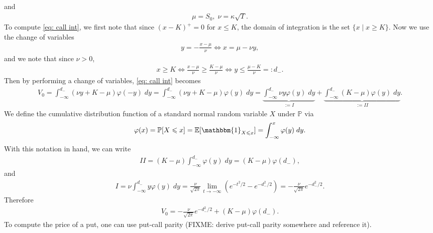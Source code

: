 \documentclass[reqno]{amsart}
\begin{document}
and
\begin{align}
	 \mu = S_0, \; \nu = \kappa \sqrt{T}.
\end{align}
To compute \eqref{eq: call int}, we first note that since $(x-K)^+ = 0$ for $x \le K$, the domain of integration is the set $\{x \mid x \ge K\}$. Now we use the change of variables 
\begin{align}
	 y = -\frac{x-\mu}{\nu} \Longleftrightarrow x = \mu - \nu y,
\end{align}
and we note that since $\nu > 0$, 
\begin{align}
	 x \ge K \Longleftrightarrow \frac{x-\mu}{\nu} \ge \frac{K - \mu}{\nu} \Longleftrightarrow y \le \frac{\mu - K}{\nu} =: d_-.
\end{align}
Then by performing a change of variables, \eqref{eq: call int} becomes 
\begin{align}
	 V_0 = \int_{-\infty}^{d_-} (\nu y + K - \mu) \varphi(-y) \; dy = \int_{-\infty}^{d_-} (\nu y + K - \mu) \varphi(y) \; dy = \underbrace{\int_{-\infty}^{d_-} \nu y \varphi(y) \; dy}_{:= I} + \underbrace{\int_{-\infty}^{d_-}  (K-\mu)\varphi(y) \; dy}_{:= II}.
\end{align}
We define the cumulative distribution function of a standard normal random variable $X$ under $\mathbb{P}$ via 
\begin{align}
	 \varphi(x) = \mathbb{P}[X \le x] = \E[ \mathbbm{1}_{X \le x}] = \int_{-\infty}^x \varphi(y) \; dy.
\end{align}
With this notation in hand, we can write 
\begin{align}
	 II = (K-\mu) \int_{-\infty}^{d_-} \varphi(y) \; dy = (K-\mu) \varphi(d_-),
\end{align}
and 
\begin{align}
	 I = \nu \int_{-\infty}^{d_-} y \varphi(y) \; dy =  \frac{\nu}{\sqrt{2\pi}} \lim_{t \to -\infty} (e^{-t^2/2} - e^{-d_-^2/2}) = -\frac{\nu}{\sqrt{2\pi}} e^{-d_-^2/2}.
\end{align}
Therefore 
\begin{align}
	 V_0 =  -\frac{\nu}{\sqrt{2\pi}} e^{-d_-^2/2} + (K-\mu) \varphi(d_-).
\end{align}
To compute the price of a put, one can use put-call parity (FIXME: derive put-call parity somewhere and reference it). 
\end{document}
